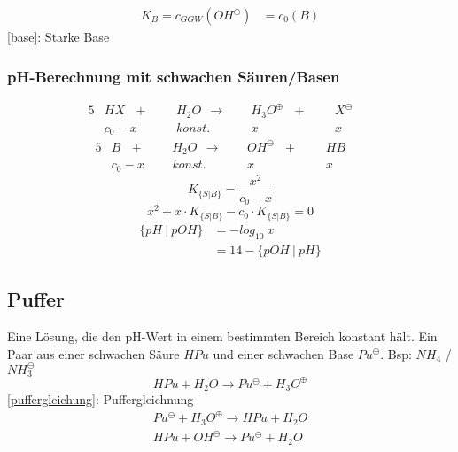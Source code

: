 {\large
	\begin{equation}
	\label{base}
	\begin{split}
	K_B=c_{GGW}(OH^\ominus) &= c_0(B)
	\end{split}
	\end{equation}	
}
\ref{base}: Starke Base
\subsubsection{pH-Berechnung mit schwachen Säuren/Basen}

\begin{alignat*}{5}
	&HX \ \ \ +\ \ \ &&H_2O\ \ \rightarrow \ \ &&H_3O^\oplus \ \ \ +\ \ \ &&X^\ominus && \\
	&c_0 - x && konst. && x && x &&
\end{alignat*}
\begin{alignat*}{5}
	&B \ \ \ +\ \ \ &&H_2O\ \ \rightarrow \ \ &&OH^\ominus \ \ \ +\ \ \ &&HB && \\
	&c_0 - x && konst. && x && x &&
\end{alignat*}
{\large
	\begin{equation}
		K_{\{S|B\}} = \frac{x^2}{c_0-x}
	\end{equation}	
}
{\large
	\begin{equation}
	x^2 + x\cdot K_{\{S|B\}} - c_0 \cdot K_{\{S|B\}} = 0
	\end{equation}
}
{\large
	\begin{equation}
	\begin{split}
		\{pH\ |\ pOH\}&=-log_{10}\ x \\
		&=14-\{pOH\  |\  pH\}
	\end{split}
	\end{equation}
}
\subsection{Puffer}
Eine Lösung, die den pH-Wert in einem bestimmten Bereich konstant hält.
Ein Paar aus einer schwachen Säure $HPu$ und einer schwachen Base $Pu^\ominus$. Bsp: $NH_4$ / $NH_3^\ominus$
{\large
\begin{equation}
	\label{puffergleichung}
	HPu + H_2O \rightarrow Pu^\ominus + H_3O^\oplus	
\end{equation}
}
\ref{puffergleichung}: Puffergleichnung
{\large
	\begin{equation}
	\label{pufferausgleich}
	\begin{split}
	Pu^\ominus + H_3O^\oplus \rightarrow HPu + H_2O \\
	HPu + OH^\ominus \rightarrow Pu^\ominus + H_2O
	\end{split}
	\end{equation}
}

